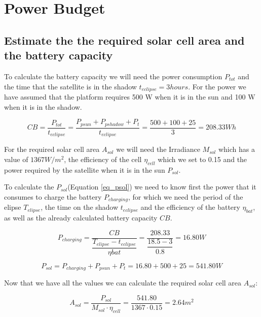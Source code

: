 \documentclass[a4paper,12pt,calibri,oneside,openany]{book}
\theoremstyle{break}
\begin{document}
\newpage
\section{Power Budget}
	\subsection{Estimate the the required solar cell area and the battery capacity}
	
		To calculate the battery capacity we will need the power consumption $P_{tot}$ and the time that the satellite is in the shadow $t_{eclipse} = 3 hours$. For the power we have assumed that the platform requires 500 W when it is in the sun and 100 W when it is in the shadow.
		
		\begin{equation} \label{eq_cb}
			CB = \dfrac{P_{tot}}{t_{eclipse}} =
			\dfrac{P_{psun} +  P_{pshadow} + P_{t} }{t_{eclipse}}=
			\dfrac{500 +  100 + 25 } {3} = 208.33 \unit{Wh}
		\end{equation}
		
		For the required solar cell area $A_{sol}$ we will need the Irradiance $M_{sol}$ which has a value of $1367 \unit{W/m^{2}}$, the efficiency of the cell $\eta_{cell}$ which we set to 0.15 and the power required by the satellite when it is in the sun $P_{sol}$.
		
		To calculate the $P_{sol}$(Equation \ref{eq_psol}) we need to know first the power that it consumes to charge the battery $P_{charging}$, for which we need the period of the elipse $T_{elipse}$, the time on the shadow $t_{eclipse}$ and the efficiency of the battery $\eta_{bat}$, as well as the already calculated battery capacity $CB$.
		
		\begin{equation} \label{eq_pcharging}
			P_{charging} = \dfrac{CB}{\dfrac{T_{elipse}-t_{eclipse}} {\eta{bat}}	} =
			\dfrac{208.33}{\dfrac{18.5-3}{0.8}	} = 16.80 \unit{W}
		\end{equation}
		
		\begin{equation} \label{eq_psol}
			P_{sol} = P_{charging} + P_{psun} + P_{t}= 
			16.80 + 500 + 25= 541.80 \unit{W}
		\end{equation}
		
		Now that we have all the values we can calculate the required solar cell area $A_{sol}$:
		
		\begin{equation} \label{eq_asol}
			A_{sol} = \dfrac{P_{sol}}{M_{sol} \cdot \eta_{cell}}= \dfrac{541.80}{1367 \cdot 0.15}=  2.64 \unit{m^{2}}
		\end{equation}
		
\end{document}
